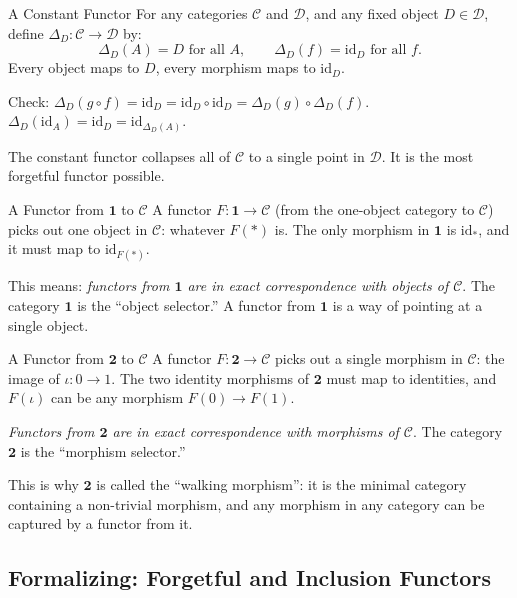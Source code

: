 \begin{example}{A Constant Functor}
For any categories $\mathcal{C}$ and $\mathcal{D}$, and any fixed object
$D \in \mathcal{D}$, define $\Delta_D : \mathcal{C} \to \mathcal{D}$ by:
\[
  \Delta_D(A) = D \text{ for all } A, \qquad
  \Delta_D(f) = \mathrm{id}_D \text{ for all } f.
\]
Every object maps to $D$, every morphism maps to $\mathrm{id}_D$.

Check: $\Delta_D(g \circ f) = \mathrm{id}_D = \mathrm{id}_D \circ \mathrm{id}_D
= \Delta_D(g) \circ \Delta_D(f)$. \checkmark\;
$\Delta_D(\mathrm{id}_A) = \mathrm{id}_D = \mathrm{id}_{\Delta_D(A)}$. \checkmark

The constant functor collapses all of $\mathcal{C}$ to a single point in
$\mathcal{D}$. It is the most forgetful functor possible.
\end{example}

\begin{example}{A Functor from $\mathbf{1}$ to $\mathcal{C}$}
A functor $F : \mathbf{1} \to \mathcal{C}$ (from the one-object category
to $\mathcal{C}$) picks out one object in $\mathcal{C}$: whatever $F(*)$
is. The only morphism in $\mathbf{1}$ is $\mathrm{id}_*$, and it must map
to $\mathrm{id}_{F(*)}$.

This means: \emph{functors from $\mathbf{1}$ are in exact correspondence with
objects of $\mathcal{C}$}. The category $\mathbf{1}$ is the ``object selector.''
A functor from $\mathbf{1}$ is a way of pointing at a single object.
\end{example}

\begin{example}{A Functor from $\mathbf{2}$ to $\mathcal{C}$}
A functor $F : \mathbf{2} \to \mathcal{C}$ picks out a single morphism in
$\mathcal{C}$: the image of $\iota : 0 \to 1$. The two identity morphisms
of $\mathbf{2}$ must map to identities, and $F(\iota)$ can be any morphism
$F(0) \to F(1)$.

\emph{Functors from $\mathbf{2}$ are in exact correspondence with morphisms
of $\mathcal{C}$}. The category $\mathbf{2}$ is the ``morphism selector.''

This is why $\mathbf{2}$ is called the ``walking morphism'': it is the
minimal category containing a non-trivial morphism, and any morphism in any
category can be captured by a functor from it.
\end{example}

\subsection{Formalizing: Forgetful and Inclusion Functors}

